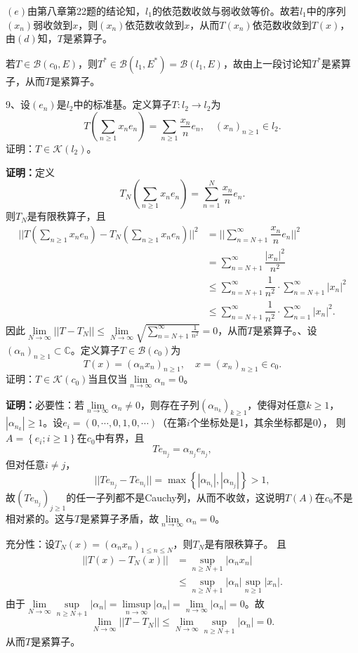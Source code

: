 \documentclass[12pt,fancyhdr,UTF8,openany]{ctexart}
\begin{document}
$(e)$由第八章第22题的结论知，$l_1$的依范数收敛与弱收敛等价。故若$l_1$中的序列$(x_n)$弱收敛到$x$，则$(x_n)$依范数收敛到$x$，从而$T(x_n)$依范数收敛到$T(x)$，由$(d)$知，$T$是紧算子。\par 
若$T\in \mathcal{B}(c_0,E)$，则$T^*\in \mathcal{B}(l_1,E^*)=\mathcal{B}(l_1,E)$，故由上一段讨论知$T^*$是紧算子，从而$T$是紧算子。\par 
\vspace{2em}
9、设$(e_n)$是$l_2$中的标准基。定义算子$T:l_2\rightarrow l_2$为
\[T(\sum_{n\geqslant 1}x_n e_n)=\sum_{n\geqslant 1}\dfrac{x_n}{n}e_n,\quad (x_n)_{n\geqslant 1}\in l_2.\]
证明：$T\in \mathcal{K}(l_2)$。\par 
\textbf{证明：}定义
\[T_N(\sum_{n\geqslant 1}x_n e_n)=\sum_{n=1}^{N}\dfrac{x_n}{n}e_n.\]
则$T_N$是有限秩算子，且
\[\begin{aligned}
	||T(\sum_{n\geqslant 1}x_n e_n)-T_N (\sum_{n\geqslant 1}x_n e_n)||^2&=||\sum_{n=N+1}^{\infty}\dfrac{x_n}{n}e_n||^2\\
	        &=\sum_{n=N+1}^\infty \dfrac{|x_n|^2}{n^2}\\
	        &\leqslant \sum_{n=N+1}^\infty \dfrac{1}{n^2}\cdot\sum_{n=N+1}^\infty |x_n|^2\\
	        &\leqslant \sum_{n=N+1}^\infty \dfrac{1}{n^2}\cdot \sum_{n=1}^\infty |x_n|^2.
\end{aligned}\] 
因此$\lim\limits_{N\rightarrow \infty}||T-T_N||\leqslant\lim\limits_{N\rightarrow \infty} \sqrt{\sum_{n=N+1}^\infty \frac{1}{n^2}}=0$，从而$T$是紧算子。、设$(\alpha_n)_{n\geqslant 1}\subset\mathbb{C}$。定义算子$T\in \mathcal{B}(c_0)$为
\[T(x)=(\alpha_n x_n)_{n\geqslant1},\quad x=(x_n)_{n\geqslant 1}\in c_0.\]
证明：$T\in \mathcal{K}(c_0)$当且仅当$\lim\limits_{n\rightarrow \infty}\alpha_n=0$。\par 
\textbf{证明：}必要性：若$\lim\limits_{n\rightarrow \infty} \alpha_n\not=0$，则存在子列$(\alpha_{n_k})_{k\geqslant 1}$，使得对任意$k\geqslant 1$，$|\alpha_{n_k}|\geqslant 1$。设$e_i=(0,\cdots,0,1,0,\cdots)$（在第$i$个坐标处是1，其余坐标都是0）， 则$A=\left\{ e_i;i\geqslant 1\right\}$在$c_0$中有界，且
\[Te_{n_j}=\alpha_{n_j}e_{n_j},\]
但对任意$i\not= j$，
\[||Te_{n_j}-Te_{n_i}||=\max\left\{|\alpha_{n_i}|,|\alpha_{n_j}|\right\}>1,\]
故$(Te_{n_j})_{j\geqslant1}$的任一子列都不是Cauchy列，从而不收敛，这说明$T(A)$在$c_0$不是相对紧的。这与$T$是紧算子矛盾，故$\lim\limits_{n\rightarrow \infty}\alpha_n=0$。\par 
充分性：设$T_N(x)=(\alpha_n x_n)_{1\leqslant n\leqslant N}$，则$T_N$是有限秩算子。
且
\[\begin{aligned}
	||T(x)-T_N(x)||&=\sup_{n\geqslant N+1}|\alpha_n x_n|\\ 
	               &\leqslant \sup_{n\geqslant N+1}|\alpha_n| \sup_{n\geqslant 1}|x_n|.
\end{aligned}\]
由于$\lim\limits_{N\rightarrow \infty} \sup\limits_{n\geqslant N+1}|\alpha_n|=\limsup\limits_{n\rightarrow \infty}|\alpha_n|=\lim\limits_{n\rightarrow \infty}|\alpha_n|=0$。故
\[\lim\limits_{N\rightarrow \infty}||T-T_N||\leqslant  \lim\limits_{N\rightarrow \infty}\sup_{n\geqslant N+1}|\alpha_n|=0.\]
从而$T$是紧算子。
\end{document}
